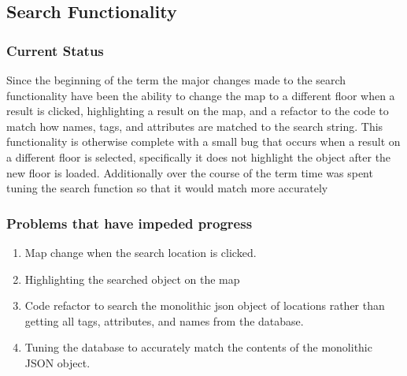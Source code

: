 \documentclass[letterpaper,10pt,serif,titlepage, onecolumn, compsoc]{IEEEtran}
\begin{document}
\subsection{Search Functionality }
\subsubsection{Current Status}
Since the beginning of the term the major changes made to the search functionality have been the ability to change the  map to a different floor  when a result is clicked, highlighting a result on the map, and a refactor to the code to match how names, tags, and attributes are matched to the search string. This functionality is otherwise complete with a small bug that occurs when a result on a different floor is selected, specifically it does not highlight the object after the new floor is loaded. Additionally over the course of the term time was spent tuning the search function so that it would match more accurately
\subsubsection{Problems that have impeded progress}
\begin{enumerate}
\item Map change when the search location is clicked.
\item Highlighting the searched object on the map
\item Code refactor to search the monolithic json object of locations rather than getting all tags, attributes, and names from the database.
\item Tuning the database to accurately match the contents of the monolithic JSON object.
\end{enumerate}
\end{document}
